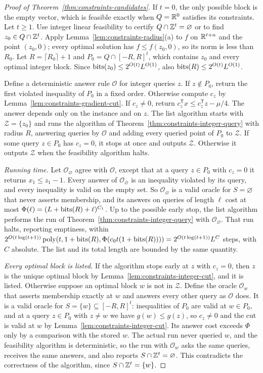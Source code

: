 \begin{proof}[Proof of Theorem~\ref{thm:constraints-candidates}]
If $t=0$, the only possible block is the empty vector, which is feasible
exactly when $Q=\mathbb R^0$ satisfies its constraints. Let $t\ge1$. Use integer
linear feasibility to certify $Q\cap\mathbb Z^t=\varnothing$ or to find
$z_0\in Q\cap\mathbb Z^t$. Apply Lemma~\ref{lem:constraints-radius}(a) to $f$ on
$\mathbb R^{t+n}$ and the point $(z_0,0)$; every optimal solution has
$f\le f(z_0,0)$, so its norm is less than $R_0$. Let $R=\lceil R_0\rceil+1$
and $P_0=Q\cap[-R,R]^t$, which contains $z_0$ and every optimal integer block.
Since $\operatorname{bits}(z_0)\le2^{O(t)}L^{O(1)}$, also $\operatorname{bits}(R)\le2^{O(t)}L^{O(1)}$.

Define a deterministic answer rule $\mathcal O$ for integer queries $z$. If
$z\notin P_0$, return the first violated inequality of $P_0$ in a fixed order.
Otherwise compute $c_z$ by Lemma~\ref{lem:constraints-gradient-cut}. If
$c_z\ne0$, return $c_z^{\mathsf T}x\le c_z^{\mathsf T}z-\mu/4$. The answer
depends only on the instance and on $z$. The list algorithm starts with
$\mathcal Z=\{z_0\}$ and runs the algorithm of
Theorem~\ref{thm:constraints-integer-query} with radius $R$, answering
queries by $\mathcal O$ and adding every queried point of $P_0$ to
$\mathcal Z$. If some query $z\in P_0$ has $c_z=0$, it stops at once and
outputs $\mathcal Z$. Otherwise it outputs $\mathcal Z$ when the feasibility
algorithm halts.

\emph{Running time.} Let $\mathcal O_\varnothing$ agree with $\mathcal O$,
except that at a query $z\in P_0$ with $c_z=0$ it returns $x_1\le z_1-1$.
Every answer of $\mathcal O_\varnothing$ is an inequality violated by its
query, and every inequality is valid on the empty set. So
$\mathcal O_\varnothing$ is a valid oracle for $S=\varnothing$ that never
asserts membership, and its answers on queries of length $\ell$ cost at most
$\Phi(\ell)=(L+\operatorname{bits}(R)+\ell)^{C_1}$. Up to the possible early stop, the list
algorithm performs the run of Theorem~\ref{thm:constraints-integer-query} with
$\mathcal O_\varnothing$. That run halts, reporting emptiness, within
$2^{O(t\log(t+1))}\operatorname{poly}(t,1+\operatorname{bits}(R),\Phi(c_0t(1+\operatorname{bits}(R))))
=2^{O(t\log(t+1))}L^{C}$ steps, with $C$ absolute. The list and its total
length are bounded by the same quantity.

\emph{Every optimal block is listed.} If the algorithm stops early at $z$
with $c_z=0$, then $z$ is the unique optimal block by
Lemma~\ref{lem:constraints-integer-cut}, and it is listed. Otherwise suppose
an optimal block $w$ is not in $\mathcal Z$. Define the oracle $\mathcal O_w$
that asserts membership exactly at $w$ and answers every other query as
$\mathcal O$ does. It is a valid oracle for $S=\{w\}\subseteq[-R,R]^t$:
inequalities of $P_0$ are valid at $w\in P_0$, and at a query $z\in P_0$ with
$z\ne w$ we have $g(w)\le g(z)$, so $c_z\ne0$ and the cut is valid at $w$ by
Lemma~\ref{lem:constraints-integer-cut}. Its answer cost exceeds $\Phi$ only by
a comparison with the stored $w$. The actual run never queried $w$, and the
feasibility algorithm is deterministic, so the run with $\mathcal O_w$ asks
the same queries, receives the same answers, and also reports
$S\cap\mathbb Z^t=\varnothing$. This contradicts the correctness of the algorithm,
since $S\cap\mathbb Z^t=\{w\}$.


\end{proof}
